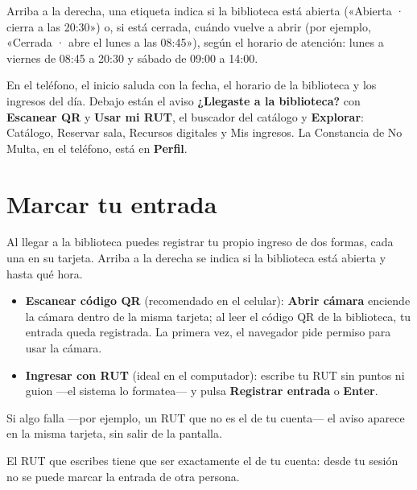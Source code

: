 \documentclass[11pt,a4paper]{report}
\begin{document}
Arriba a la derecha, una etiqueta indica si la biblioteca está abierta
(«Abierta · cierra a las 20:30») o, si está cerrada, cuándo vuelve a abrir
(por ejemplo, «Cerrada · abre el lunes a las 08:45»), según el horario de
atención: lunes a viernes de 08:45 a 20:30 y sábado de 09:00 a 14:00.

En el teléfono, el inicio saluda con la fecha, el horario de la biblioteca
y los ingresos del día. Debajo están el aviso \textbf{¿Llegaste a la
biblioteca?} con \textbf{Escanear QR} y \textbf{Usar mi RUT}, el buscador
del catálogo y \textbf{Explorar}: Catálogo, Reservar sala, Recursos
digitales y Mis ingresos. La Constancia de No Multa, en el teléfono, está
en \textbf{Perfil}.

\chapter{Marcar tu entrada}

Al llegar a la biblioteca puedes registrar tu propio ingreso de dos formas,
cada una en su tarjeta. Arriba a la derecha se indica si la biblioteca está
abierta y hasta qué hora.


\begin{itemize}
  \item \textbf{Escanear código QR} (recomendado en el celular):
  \textbf{Abrir cámara} enciende la cámara dentro de la misma tarjeta; al
  leer el código QR de la biblioteca, tu entrada queda registrada. La
  primera vez, el navegador pide permiso para usar la cámara.
  \item \textbf{Ingresar con RUT} (ideal en el computador): escribe tu RUT
  sin puntos ni guion ---el sistema lo formatea--- y pulsa
  \textbf{Registrar entrada} o \textbf{Enter}.
\end{itemize}

Si algo falla ---por ejemplo, un RUT que no es el de tu cuenta--- el aviso
aparece en la misma tarjeta, sin salir de la pantalla.


\begin{nota}
El RUT que escribes tiene que ser exactamente el de tu cuenta: desde tu
sesión no se puede marcar la entrada de otra persona.
\end{nota}
\end{document}
